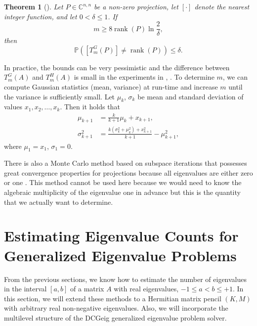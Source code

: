\documentclass[%
	paper=a4,
	fontsize=10pt,
	DIV11,BCOR10mm,
	numbers=noenddot,
	abstract=yes
]{scrartcl}
\newcommand{\F}{\mathbb{C}}
\DeclareMathOperator{\rank}{rank}
\newtheorem{theorem}{Theorem}[section]
\theoremstyle{definition}
\begin{document}
\begin{theorem}[{\cite[Corollary~4]{Roosta-Khorasani2015}}]
	Let $P \in \F^{n,n}$ be a non-zero projection, let $[\cdot]$ denote the
	nearest integer function, and let $0 < \delta \leq 1$. If
	\[ m \geq 8 \rank(P) \ln \frac{2}{\delta}, \]
	then
	\[ \mathbb{P}\left( [T_m^G(P)] \neq \rank(P) \right) \leq \delta. \]
\end{theorem}

In practice, the bounds can be very pessimistic and the difference between
$T_m^G(A)$ and $T_m^H(A)$ is small in the experiments in
\cite[§5]{Roosta-Khorasani2015}, \cite[§9]{Avron2011}. To determine $m$, we can
compute Gaussian statistics (mean, variance) at run-time and increase $m$ until
the variance is sufficiently small. Let $\mu_k$, $\sigma_k$ be mean and standard
deviation of values $x_1, x_2, \dotsc, x_k$. Then it holds that
\begin{align*}
	\mu_{k+1} &= \frac{k}{k+1} \mu_k + x_{k+1}, \\
	\sigma_{k+1}^2 &=
		\frac{k (\sigma_k^2 + \mu_k^2) + x_{k+1}^2}{k+1} - \mu_{k+1}^2,
\end{align*}
where $\mu_1 = x_1$, $\sigma_1 = 0$.

There is also a Monte Carlo method based on subspace iterations that possesses
great convergence properties for projections because all eigenvalues are either
zero or one \cite{Saibaba2016}. This method cannot be used here because we would
need to know the algebraic multiplicity of the eigenvalue one in advance but
this is the quantity that we actually want to determine.



\section{Estimating Eigenvalue Counts for Generalized Eigenvalue Problems}

From the previous sections, we know how to estimate the number of eigenvalues in
the interval $[a, b]$ of a matrix $A$ with real eigenvalues, $-1 \leq a < b \leq
+1$. In this section, we will extend these methods to a Hermitian matrix pencil
$(K, M)$ with arbitrary real non-negative eigenvalues. Also, we will incorporate
the multilevel structure of the DCGeig generalized eigenvalue problem solver.
\end{document}

